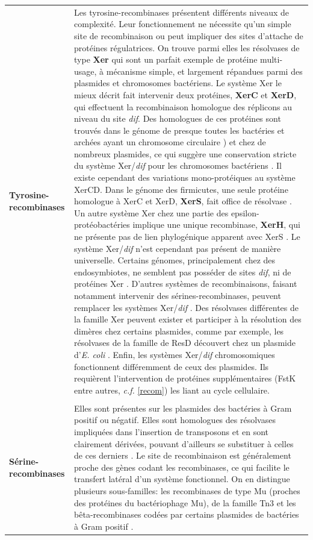 \begin{longtable}{@{\hspace{-3cm}\hspace{1cm}} >{\bfseries}p{} | >{\small}p{}}
	Tyrosine-recombinases & Les tyrosine-recombinases présentent différents niveaux de complexité. Leur fonctionnement ne nécessite qu'un simple site de recombinaison ou peut impliquer des sites d'attache de protéines régulatrices. On trouve parmi elles les résolvases de type \textbf{Xer} qui sont un parfait exemple de protéine multi-usage, à mécanisme simple, et largement répandues parmi des plasmides et chromosomes bactériens. Le système Xer le mieux décrit fait intervenir deux protéines, \textbf{XerC} et \textbf{XerD}, qui effectuent la recombinaison homologue des réplicons au niveau du site \textit{dif}. Des homologues de ces protéines sont trouvés dans le génome de presque toutes les bactéries et archées ayant un chromosome circulaire \citep{hallet2004dna}\citep{cortez2010evidence}) et chez de nombreux plasmides, ce qui suggère une conservation stricte du système Xer/\textit{dif} pour les chromosomes bactériens \citep{Carnoy2009,Kono2011}. Il existe cependant des variations mono-protéiques au système XerCD. Dans le génome des firmicutes, une seule protéine homologue à XerC et XerD, \textbf{XerS}, fait office de résolvase \citep{Leroux2011}. Un autre système Xer chez une partie des epsilon-protéobactéries implique une unique recombinase, \textbf{XerH}, qui ne présente pas de lien phylogénique apparent avec XerS \citep{Carnoy2009}. Le système Xer/\textit{dif} n'est cependant pas présent de manière universelle. Certains génomes, principalement chez des endosymbiotes, ne semblent pas posséder de sites \textit{dif}, ni de protéines Xer \citep{Carnoy2009,Kono2011}. D'autres systèmes de recombinaisons, faisant notamment intervenir des sérines-recombinases, peuvent remplacer les systèmes Xer/\textit{dif} \citep{Carnoy2009}. Des résolvases différentes de la famille Xer peuvent exister et participer à la résolution des dimères chez certains plasmides, comme par exemple, les résolvases de la famille de ResD découvert chez un plasmide d'\textit{E. coli} \citep{hallet2004dna}. Enfin, les systèmes Xer/\textit{dif} chromosomiques fonctionnent différemment de ceux des plasmides. Ils requièrent l'intervention de protéines supplémentaires (FstK entre autres, \textit{c.f.} \ref{recom}) les liant au cycle cellulaire. \\
	\\[-0.2cm]
	Sérine-recombinases & Elles sont présentes sur les plasmides des bactéries à Gram positif ou négatif. Elles sont homologues des résolvases impliquées dans l'insertion de transposons et en sont clairement dérivées, pouvant d'ailleurs se substituer à celles de ces derniers \citep{hallet2004dna}. Le site de recombinaison est généralement proche des gènes codant les recombinases, ce qui facilite le transfert latéral d'un système fonctionnel. On en distingue plusieurs sous-familles: les recombinases de type Mu (proches des protéines du bactériophage Mu), de la famille Tn3 et les bêta-recombinases codées par certains plasmides de bactéries à Gram positif \citep{hallet2004dna}.
\end{longtable}
 
